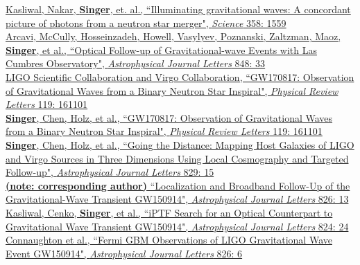 \documentclass[10pt, letterpaper]{article} %
\newcommand{\years}[1]{\marginnote{\scriptsize #1}} %
\begin{document}
%
\years{2017}\href{https://doi.org/10.1126/science.aap9455}{Kasliwal, Nakar, \textbf{Singer}, et. al., “Illuminating gravitational waves: A concordant picture of photons from a neutron star merger", \emph{Science} 358: 1559}\\[0.125cm]
%
\years{2017}\href{https://doi.org/10.3847/2041-8213/aa910f}{Arcavi, McCully, Hosseinzadeh, Howell, Vasylyev, Poznanski, Zaltzman, Maoz, \textbf{Singer}, et al., “Optical Follow-up of Gravitational-wave Events with Las Cumbres Observatory", \emph{Astrophysical Journal Letters} 848: 33}\\[0.125cm]
%
\years{2017}\href{https://doi.org/10.1103/PhysRevLett.119.161101}{LIGO Scientific Collaboration and Virgo Collaboration, “GW170817: Observation of Gravitational Waves from a Binary Neutron Star Inspiral", \emph{Physical Review Letters} 119: 161101}\\[0.125cm]
%
\years{2017}\href{https://doi.org/10.1103/PhysRevLett.119.161101}{\textbf{Singer}, Chen, Holz, et al., “GW170817: Observation of Gravitational Waves from a Binary Neutron Star Inspiral", \emph{Physical Review Letters} 119: 161101}\\[0.125cm]
%
\years{2016}\href{https://dx.doi.org/10.3847/2041-8205/829/1/L15}{\textbf{Singer}, Chen, Holz, et al., “Going the Distance: Mapping Host Galaxies of LIGO and Virgo Sources in Three Dimensions Using Local Cosmography and Targeted Follow-up", \emph{Astrophysical Journal Letters} 829: 15}\\[0.125cm]
%
\years{2016}\href{https://dx.doi.org/10.3847/2041-8205/826/1/L13}{\textbf{(note: corresponding author)} “Localization and Broadband Follow-Up of the Gravitational-Wave Transient GW150914", \emph{Astrophysical Journal Letters} 826: 13}\\[0.125cm]
%
\years{2016}\href{https://dx.doi.org/10.3847/2041-8205/824/2/L24}{Kasliwal, Cenko, \textbf{Singer}, et al., “iPTF Search for an Optical Counterpart to Gravitational Wave Transient GW150914", \emph{Astrophysical Journal Letters} 824: 24}\\[0.125cm]
%
\years{2016}\href{https://dx.doi.org/10.3847/2041-8205/826/1/L6}{Connaughton et al., “Fermi GBM Observations of LIGO Gravitational Wave Event GW150914", \emph{Astrophysical Journal Letters} 826: 6}\\[0.125cm]
%
\end{document}
